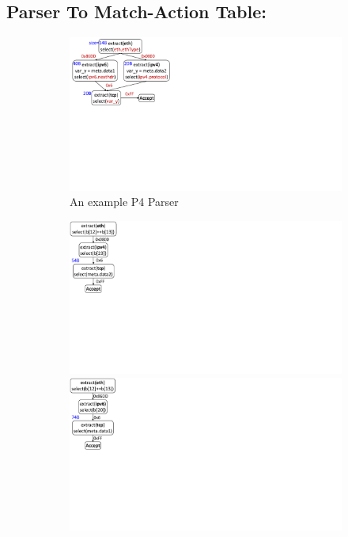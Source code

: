 \subsection{Parser To Match-Action Table:}
\label{subsection:parser-to-match-action-table}
\begin{figure}
    \begin{subfigure}[b]{0.25\linewidth}
        \centering
        \includegraphics[trim=4 270 596 0, clip,scale=0.37]{parser-transformation-example}    
        \caption{An example P4 Parser}
        \label{subfig:parser}
    \end{subfigure}
    \begin{subfigure}[b]{0.26\linewidth}
        \centering
        \includegraphics[trim=0 285 794 0, clip,scale=0.37]{parser-example-se-1}
        \includegraphics[trim=0 285 794 0, clip,scale=0.37]{parser-example-se-2}

\end{subfigure}
\end{figure}
